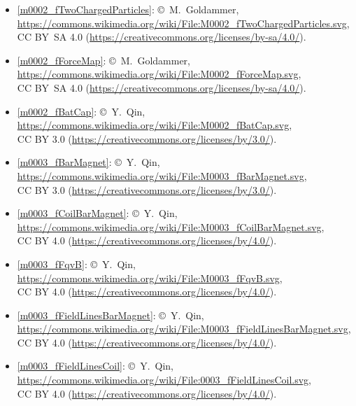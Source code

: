 \begin{itemize}

\item[Fig.] \label{m0002_fTwoChargedParticles_Credit}
  \ref{m0002_fTwoChargedParticles}:
  \copyright~M.\ Goldammer, 
  \url{https://commons.wikimedia.org/wiki/File:M0002_fTwoChargedParticles.svg},\\ 
  CC BY~SA 4.0 (\url{https://creativecommons.org/licenses/by-sa/4.0/}).

\item[Fig.] \label{m0002_fForceMap_Credit}
  \ref{m0002_fForceMap}:
  \copyright~M.\ Goldammer, 
  \url{https://commons.wikimedia.org/wiki/File:M0002_fForceMap.svg},\\ 
  CC BY~SA 4.0 (\url{https://creativecommons.org/licenses/by-sa/4.0/}).

\item[Fig.] \label{m0002_fBatCap_Credit}
  \ref{m0002_fBatCap}:
  \copyright~Y.\ Qin, 
  \url{https://commons.wikimedia.org/wiki/File:M0002_fBatCap.svg},\\ 
  CC BY 3.0 (\url{https://creativecommons.org/licenses/by/3.0/}).

\item[Fig.] \label{m0003_fBarMagnet_Credit}
  \ref{m0003_fBarMagnet}:
  \copyright~Y.\ Qin, 
  \url{https://commons.wikimedia.org/wiki/File:M0003_fBarMagnet.svg},\\ 
  CC BY 3.0 (\url{https://creativecommons.org/licenses/by/3.0/}).

\item[Fig.] \label{m0003_fCoilBarMagnet_Credit}
  \ref{m0003_fCoilBarMagnet}:
  \copyright~Y.\ Qin, 
  \url{https://commons.wikimedia.org/wiki/File:M0003_fCoilBarMagnet.svg},\\ 
  CC BY 4.0 (\url{https://creativecommons.org/licenses/by/4.0/}).

\item[Fig.] \label{m0003_fFqvB_Credit}
  \ref{m0003_fFqvB}:
  \copyright~Y.\ Qin, 
  \url{https://commons.wikimedia.org/wiki/File:M0003_fFqvB.svg},\\ 
  CC BY 4.0 (\url{https://creativecommons.org/licenses/by/4.0/}).

\item[Fig.] \label{m0003_fFieldLinesBarMagnet_Credit}
  \ref{m0003_fFieldLinesBarMagnet}:
  \copyright~Y.\ Qin, 
  \url{https://commons.wikimedia.org/wiki/File:M0003_fFieldLinesBarMagnet.svg},\\ 
  CC BY 4.0 (\url{https://creativecommons.org/licenses/by/4.0/}).

\item[Fig.] \label{m0003_fFieldLinesCoil_Credit}
  \ref{m0003_fFieldLinesCoil}:
  \copyright~Y.\ Qin, 
  \url{https://commons.wikimedia.org/wiki/File:0003_fFieldLinesCoil.svg},\\ 
  CC BY 4.0 (\url{https://creativecommons.org/licenses/by/4.0/}).

\end{itemize}

\twocolumn
